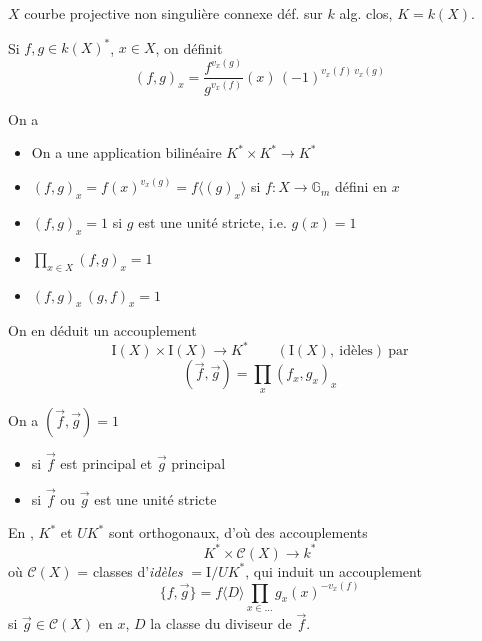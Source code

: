 \documentclass[11pt,a4paper]{article}
\begin{document}


$X$ courbe projective non singulière connexe déf. sur $k$ alg. clos,
$K = k(X)$.

Si $f, g \in k(X)^{*}$, $x \in X$, on définit
\[
\boxed{\;(f,g)_x = \frac{f^{v_x(g)}}{g^{v_x(f)}}(x)\,
(-1)^{v_x(f)\,v_x(g)}\;}
\]

On a
\begin{itemize}
  \item[(i)] On a une application bilinéaire $K^{*} \times K^{*} \to
  K^{*}$
  \item[(ii)] $(f,g)_x = f(x)^{v_x(g)} = f\langle (g)_x \rangle$ si
  $f : X \to \mathbb{G}_m$ défini en $x$
  \item[(iii)] $(f,g)_x = 1$ si $g$ est une unité stricte, i.e.
  $g(x) = 1$
  \item[(iv)] $\displaystyle\prod_{x \in X} (f,g)_x = 1$
  \item[(v)] $(f,g)_x\,(g,f)_x = 1$
\end{itemize}


On en déduit un accouplement
\[
\mathrm{I}(X) \times \mathrm{I}(X) \longrightarrow K^{*}
\qquad (\mathrm{I}(X),\ \text{idèles})\ \text{par}
\]
\[
(\vec{f}, \vec{g}) = \prod_x (f_x, g_x)_x
\]

On a $(\vec{f}, \vec{g}) = 1$
\begin{itemize}
  \item si $\vec{f}$ est principal et $\vec{g}$ principal \struck{\ill{}}
  \item si $\vec{f}$ ou $\vec{g}$ est une unité stricte
\end{itemize}

En , $K^{*}$ et $UK^{*}$ sont orthogonaux, d'où
des accouplements
\[
\boxed{\;K^{*} \times \mathcal{C}(X) \longrightarrow k^{*}\;}
\]
où $\mathcal{C}(X)$ = classes d'\emph{idèles} $= \mathrm{I}/UK^{*}$,
qui induit un accouplement
\[
\{f, \vec{g}\} = f\langle D \rangle
\prod_{x \in \ldots} g_x(x)^{-v_x(f)}
\]
si \ill{} $\vec{g} \in \mathcal{C}(X)$ \ill{}  en $x$,
$D$ \ill{} la classe du diviseur de $\vec{f}$.
\end{document}
